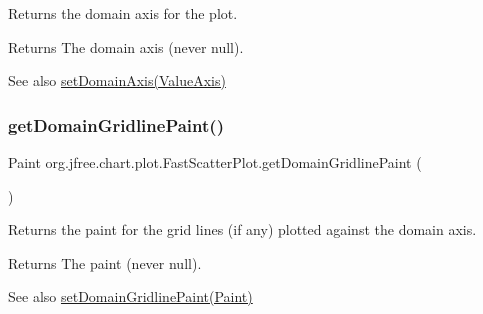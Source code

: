 Returns the domain axis for the plot.

\begin{DoxyReturn}{Returns}
The domain axis (never {\ttfamily null}).
\end{DoxyReturn}
\begin{DoxySeeAlso}{See also}
\mbox{\hyperlink{classorg_1_1jfree_1_1chart_1_1plot_1_1_fast_scatter_plot_aea7696ebad4c4e6c9734dc5027633384}{set\+Domain\+Axis(\+Value\+Axis)}} 
\end{DoxySeeAlso}
\mbox{\label{classorg_1_1jfree_1_1chart_1_1plot_1_1_fast_scatter_plot_a7b1602a024385bab17b05b27b0f55cda}} 
\subsubsection{\texorpdfstring{get\+Domain\+Gridline\+Paint()}{getDomainGridlinePaint()}}
{\footnotesize\ttfamily Paint org.\+jfree.\+chart.\+plot.\+Fast\+Scatter\+Plot.\+get\+Domain\+Gridline\+Paint (\begin{DoxyParamCaption}{ }\end{DoxyParamCaption})}

Returns the paint for the grid lines (if any) plotted against the domain axis.

\begin{DoxyReturn}{Returns}
The paint (never {\ttfamily null}).
\end{DoxyReturn}
\begin{DoxySeeAlso}{See also}
\mbox{\hyperlink{classorg_1_1jfree_1_1chart_1_1plot_1_1_fast_scatter_plot_af49e6d29cc7cc60458d27ace835c238d}{set\+Domain\+Gridline\+Paint(\+Paint)}} 
\end{DoxySeeAlso}
\mbox{\label{classorg_1_1jfree_1_1chart_1_1plot_1_1_fast_scatter_plot_ab2565956fc394a1587e83ce684bdad97}} 
